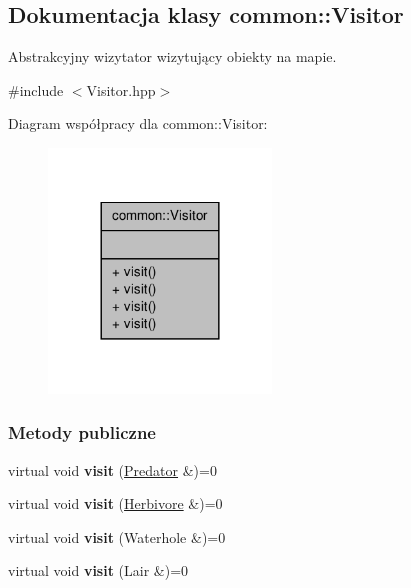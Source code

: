 \hypertarget{classcommon_1_1Visitor}{\subsection{Dokumentacja klasy common\-:\-:Visitor}
\label{classcommon_1_1Visitor}
}


Abstrakcyjny wizytator wizytujący obiekty na mapie.  




{\ttfamily \#include $<$Visitor.\-hpp$>$}



Diagram współpracy dla common\-:\-:Visitor\-:
\nopagebreak
\begin{figure}[H]
\begin{center}
\leavevmode
\includegraphics[width=168pt]{classcommon_1_1Visitor__coll__graph}
\end{center}
\end{figure}
\subsubsection*{Metody publiczne}
\begin{DoxyCompactItemize}
\item 
\hypertarget{classcommon_1_1Visitor_ad7b2ac5087a43fa01cd14ba98ec3e1cc}{virtual void {\bfseries visit} (\hyperlink{classcommon_1_1Predator}{Predator} \&)=0}\label{classcommon_1_1Visitor_ad7b2ac5087a43fa01cd14ba98ec3e1cc}

\item 
\hypertarget{classcommon_1_1Visitor_a88803551516d9fe514dfbeac9bc2f643}{virtual void {\bfseries visit} (\hyperlink{classcommon_1_1Herbivore}{Herbivore} \&)=0}\label{classcommon_1_1Visitor_a88803551516d9fe514dfbeac9bc2f643}

\item 
\hypertarget{classcommon_1_1Visitor_a97d1715c432dd12f2ae807e39190a8ec}{virtual void {\bfseries visit} (Waterhole \&)=0}\label{classcommon_1_1Visitor_a97d1715c432dd12f2ae807e39190a8ec}

\item 
\hypertarget{classcommon_1_1Visitor_ac9de4a2e4b1a51286cce7dd374fd0eb3}{virtual void {\bfseries visit} (Lair \&)=0}\label{classcommon_1_1Visitor_ac9de4a2e4b1a51286cce7dd374fd0eb3}

\end{DoxyCompactItemize}


